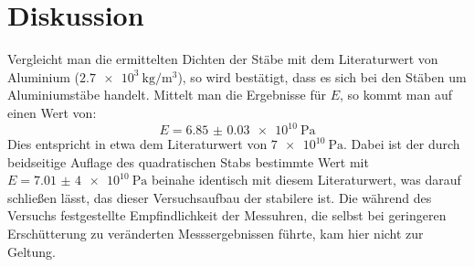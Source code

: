 
\section{Diskussion}
\label{sec:Diskussion}

Vergleicht man die ermittelten Dichten der Stäbe mit dem Literaturwert von Aluminium ($\SI{2,7e3}{\kilogram\per\cubic\metre}$), so wird bestätigt, dass es sich bei den Stäben um Aluminiumstäbe handelt.
Mittelt man die Ergebnisse für $E$, so kommt man auf einen Wert von:
\[
	E=\SI{6.85(3)e10}{\pascal}
\]
Dies entspricht in etwa dem Literaturwert von $\SI{7e10}{\pascal}$.
Dabei ist der durch beidseitige Auflage des quadratischen Stabs bestimmte Wert mit $E = \SI{7,01(4)e10}{\pascal}$ beinahe identisch mit diesem Literaturwert, was darauf schließen lässt, das dieser Versuchsaufbau der stabilere ist.\newline
Die während des Versuchs festgestellte Empfindlichkeit der Messuhren, die selbst bei geringeren Erschütterung zu veränderten Messsergebnissen führte, kam hier nicht zur Geltung.